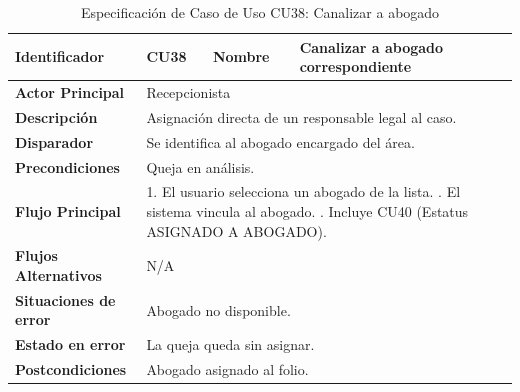 \begingroup
\setlength{\parskip}{0pt}
\begin{longtable}{|p{3.5cm}|p{2cm}|p{2.5cm}|p{7cm}|}
\caption{Especificación de Caso de Uso CU38: Canalizar a abogado}
\label{tab:cu38} \\
\hline
\textbf{Identificador} & CU38 & \textbf{Nombre} & Canalizar a abogado correspondiente \\ \hline
\textbf{Actor Principal} & \multicolumn{3}{p{11.5cm}|}{Recepcionista} \\ \hline
\textbf{Descripción} & \multicolumn{3}{p{11.5cm}|}{Asignación directa de un responsable legal al caso.} \\ \hline
\textbf{Disparador} & \multicolumn{3}{p{11.5cm}|}{Se identifica al abogado encargado del área.} \\ \hline
\textbf{Precondiciones} & \multicolumn{3}{p{11.5cm}|}{Queja en análisis.} \\ \hline
\textbf{Flujo Principal} & \multicolumn{3}{p{11.5cm}|}{1. El usuario selecciona un abogado de la lista. \newline 2. El sistema vincula al abogado. \newline 3. Incluye CU40 (Estatus ASIGNADO A ABOGADO).} \\ \hline
\textbf{Flujos Alternativos} & \multicolumn{3}{p{11.5cm}|}{N/A} \\ \hline
\textbf{Situaciones de error} & \multicolumn{3}{p{11.5cm}|}{Abogado no disponible.} \\ \hline
\textbf{Estado en error} & \multicolumn{3}{p{11.5cm}|}{La queja queda sin asignar.} \\ \hline
\textbf{Postcondiciones} & \multicolumn{3}{p{11.5cm}|}{Abogado asignado al folio.} \\ \hline
\end{longtable}
\endgroup

\vspace{0.8cm}

